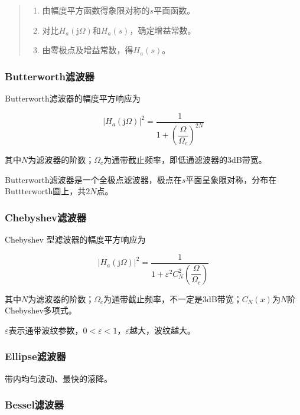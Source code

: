 \documentclass[cn, hazy, blue, normal, 14pt]{elegantnote}
\begin{document}
\begin{quote}
\begin{enumerate}
    \item 由幅度平方函数得象限对称的$s$平面函数。
    \item 对比$H_a(\text{j}\Omega)$和$H_a(s)$，确定增益常数。
    \item 由零极点及增益常数，得$H_a(s)$。
\end{enumerate}
\end{quote}

\subsubsection{Butterworth滤波器}

Butterworth滤波器的幅度平方响应为

\begin{equation}
    |H_a(\text{j}\Omega)|^2=\frac{1}{1+\left(\dfrac{\Omega}{\Omega_c}\right)^{2N}}
\end{equation}

其中$N$为滤波器的阶数；$\Omega_c$为通带截止频率，即低通滤波器的3dB带宽。

Butterworth滤波器是一个全极点滤波器，极点在$s$平面呈象限对称，分布在Buttterworth圆上，共$2N$点。

\subsubsection{Chebyshev滤波器}

Chebyshev \uppercase\expandafter{}型滤波器的幅度平方响应为

\begin{equation}
    |H_a(\text{j}\Omega)|^2=\frac{1}{1+\varepsilon^2 C_N^2 \left(\dfrac{\Omega}{\Omega_c}\right)}
\end{equation}

其中$N$为滤波器的阶数；$\Omega_c$为通带截止频率，不一定是3dB带宽；$C_N(x)$为$N$阶Chebyshev多项式。

$\varepsilon$表示通带波纹参数，$0<\varepsilon<1$，$\varepsilon$越大，波纹越大。

\subsubsection{Ellipse滤波器}

带内均匀波动、最快的滚降。

\subsubsection{Bessel滤波器}
\end{document}
